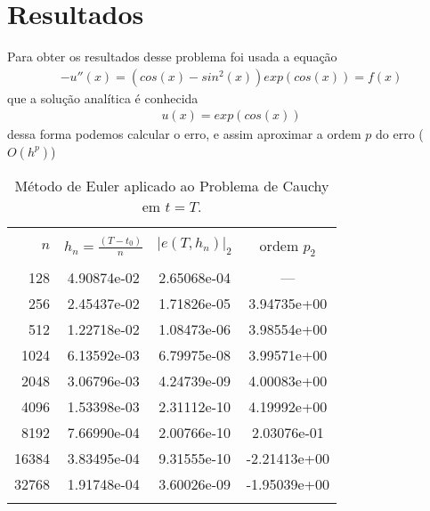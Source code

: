 \documentclass[a4paper,10pt]{article}
\begin{document}
\section{Resultados}
Para obter os resultados desse problema foi usada a equação
\begin{eqnarray}
	-u''(x) = ( cos(x) - sin^2(x))exp(cos(x)) = f(x)
\end{eqnarray}
que a solução analítica é conhecida
\begin{eqnarray}
	u(x) = exp(cos(x))
\end{eqnarray}
dessa forma podemos calcular o erro, e assim aproximar a ordem $p$ do erro ($O(h^p)$)
\begin{table}[!ht]
\centering
\begin{tabular}{rccc}\hline\hline\\
 $n$ &$h_n=\displaystyle \frac{(T-t_0)}{n}$ & $\left|e(T, h_n)\right|_2$  & ordem $p_2$ \\ 
	\hline\hline
	\\
	128 & 4.90874e-02 & 2.65068e-04& --- \\
	256 & 2.45437e-02 & 1.71826e-05&3.94735e+00 \\
	512 & 1.22718e-02 & 1.08473e-06&3.98554e+00\\
	1024 & 6.13592e-03 & 6.79975e-08&3.99571e+00\\
	2048 & 3.06796e-03 & 4.24739e-09&4.00083e+00\\
	4096 & 1.53398e-03 & 2.31112e-10&4.19992e+00\\
	8192 & 7.66990e-04 & 2.00766e-10&2.03076e-01\\
	16384 & 3.83495e-04 & 9.31555e-10&-2.21413e+00\\
	32768 & 1.91748e-04 & 3.60026e-09&-1.95039e+00\\
	\\
  		\hline\hline
\end{tabular}
\caption{Método de Euler aplicado ao Problema de Cauchy em $t=T$. 
}
\label{tabmodel-1}
\end{table}
\end{document}
